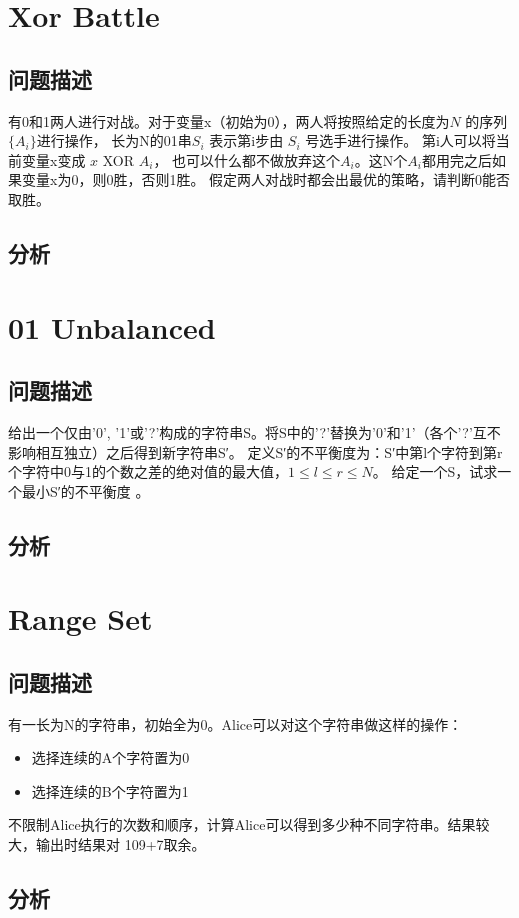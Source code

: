 
\section{Xor Battle}
\subsection{问题描述}

有0和1两人进行对战。对于变量x（初始为0），两人将按照给定的长度为\( N \) 的序列\( \{A_i\} \)进行操作，
长为N的01串\( S_i \) 表示第i步由 \( S_i \) 号选手进行操作。
第i人可以将当前变量x变成 \( x \)   XOR  \( A_i \)，
也可以什么都不做放弃这个\( A_i \)。这N个\( A_i \)都用完之后如果变量x为0，则0胜，否则1胜。
假定两人对战时都会出最优的策略，请判断0能否取胜。


\subsection{分析}


\newpage

\section{01 Unbalanced}
\subsection{问题描述}

给出一个仅由'0', '1'或'?'构成的字符串S。将S中的'?'替换为'0'和'1'（各个'?'互不影响相互独立）之后得到新字符串S′。
定义S′的不平衡度为：S′中第l个字符到第r个字符中0与1的个数之差的绝对值的最大值，\( 1 \leq l \leq r \leq N \)。
给定一个S，试求一个最小S′的不平衡度 。

\subsection{分析}


\newpage
\section{Range Set}
\subsection{问题描述}

有一长为N的字符串，初始全为0。Alice可以对这个字符串做这样的操作：

\begin{itemize}
    \item 选择连续的A个字符置为0
    \item 选择连续的B个字符置为1
\end{itemize}

不限制Alice执行的次数和顺序，计算Alice可以得到多少种不同字符串。结果较大，输出时结果对 109+7取余。

\subsection{分析}

